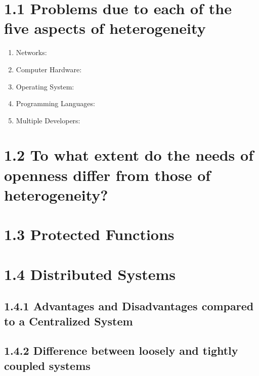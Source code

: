 \documentclass{article}
\begin{document}
	\pagestyle{fancy}
	\hfill
	
	\section*{1.1 Problems due to each of the five aspects of heterogeneity}
	\begin{adjustwidth}{2em}{2em}
		\begin{enumerate}
			\item Networks: \\
			\item Computer Hardware: \\
			\item Operating System: \\
			\item Programming Languages: \\
			\item Multiple Developers: \\
		\end{enumerate}
	\end{adjustwidth}
	
	\section*{1.2 To what extent do the needs of openness differ from those of heterogeneity?}
	\begin{adjustwidth}{2em}{2em}
	\end{adjustwidth}
	
	\section*{1.3 Protected Functions}
	\begin{adjustwidth}{2em}{2em}
	\end{adjustwidth}
	
	\section*{1.4 Distributed Systems}
	\begin{adjustwidth}{2em}{2em}
		\subsection*{1.4.1 Advantages and Disadvantages compared to a Centralized System}
		\begin{adjustwidth}{2em}{2em}
		\end{adjustwidth}
		\subsection*{1.4.2 Difference between loosely and tightly coupled systems}
		\begin{adjustwidth}{2em}{2em}
		\end{adjustwidth}
	\end{adjustwidth}
\end{document}
